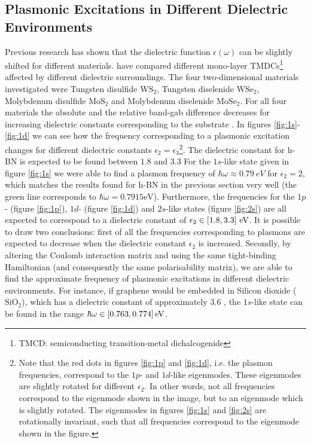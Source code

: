 
\subsection{Plasmonic Excitations in Different Dielectric Environments}\label{different_dielectric}

Previous research \cite{Steinke2020} has shown that the dielectric function $\epsilon(\omega)$ can be slightly shifted for different materials. \textcite{Steinke2020} have compared different mono-layer TMDCs\footnote{TMCD: semiconducting transition-metal dichalcogenide} affected by different dielectric surroundings. The four two-dimensional materials investigated were Tungsten disulfide $\mathrm{WS_2}$, Tungsten diselenide $\mathrm{WSe_2}$, Molybdenum disulfide $\mathrm{MoS_2}$ and Molybdenum diselenide $\mathrm{MoSe_2}$. For all four materials the absolute and the relative band-gab difference decreases for increasing dielectric constants corresponding to the substrate \cite{Steinke2020}. In figures \ref{fig:1s}-\ref{fig:1d} we can see how the frequency corresponding to a plasmonic excitation changes for different dielectric constants $\epsilon_2=\epsilon_3$\footnote{Note that the red dots in figures \ref{fig:1p} and \ref{fig:1d}, i.e. the plasmon frequencies, correspond to the $1p$- and $1d$-like eigenmodes. These eigenmodes are slightly rotated for different $\epsilon_2$. In other words, not all frequencies correspond to the eigenmode shown in the image, but to an eigenmode which is slightly rotated. The eigenmodes in figures \ref{fig:1s} and \ref{fig:2s} are rotationally invariant, such that all frequencies correspond to the eigenmode shown in the figure.}. The dielectric constant for h-BN is expected to be found between $1.8$ and $3.3$ \cite{Steinke2020,Laturia2018} For the $1s$-like state given in figure \ref{fig:1s} we were able to find a plasmon frequency of $\hbar\omega\approx\SI{0.79}{eV}$ for $\epsilon_2=2$, which matches the results found for h-BN in the previous section very well (the green line corresponds to $\hbar\omega = 0.7915\mathrm{eV}$). Furthermore, the frequencies for the $1p$- (figure \ref{fig:1p}), $1d$- (figure \ref{fig:1d}) and $2s$-like states (figure \ref{fig:2s}) are all expected to correspond to a dielectric constant of $\epsilon_2 \in \left[1.8,3.3\right]\,\mathrm{eV}$. It is possible to draw two conclusions: first of all the frequencies corresponding to plasmons are expected to decrease when the dielectric constant $\epsilon_2$ is increased. Secondly, by altering the Coulomb interaction matrix and using the same tight-binding Hamiltonian (and consequently the same polarisability matrix), we are able to find the approximate frequency of plasmonic excitations in different dielectric environments. For instance, if graphene would be embedded in Silicon dioxide ($\mathrm{SiO_2}$), which has a dielectric constant of approximately $3.6$ \cite{Steinke2020, Lemonik2012}, the $1s$-like state can be found in the range $\hbar\omega \in \left[0.763, 0.774\right] \mathrm{eV}$.

